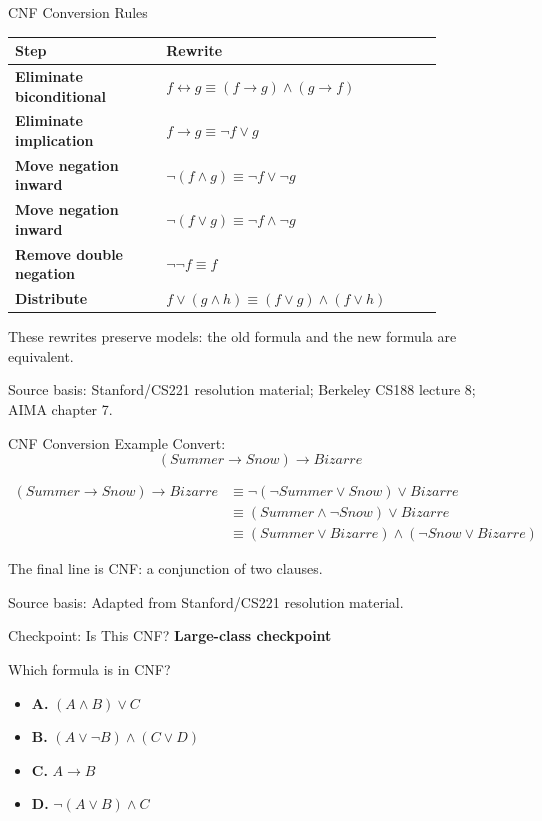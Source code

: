 \documentclass[aspectratio=169,11pt]{beamer}
\newcommand{\activity}{\textbf{\color{unsworange}Large-class checkpoint}}
\newcommand{\choice}[2]{\textbf{#1.} #2}
\newcommand{\source}[1]{\vfill{\scriptsize\color{darkgrey}Source basis: #1}}
\begin{document}
\begin{frame}{CNF Conversion Rules}
  \small
  \begin{tabular}{>{\bfseries}p{0.30\linewidth}p{0.55\linewidth}}
    \toprule
    Step & Rewrite \\
    \midrule
    Eliminate biconditional & $f \leftrightarrow g \equiv (f \rightarrow g) \land (g \rightarrow f)$ \\
    Eliminate implication & $f \rightarrow g \equiv \neg f \lor g$ \\
    Move negation inward & $\neg(f \land g) \equiv \neg f \lor \neg g$ \\
    Move negation inward & $\neg(f \lor g) \equiv \neg f \land \neg g$ \\
    Remove double negation & $\neg\neg f \equiv f$ \\
    Distribute & $f \lor (g \land h) \equiv (f \lor g) \land (f \lor h)$ \\
    \bottomrule
  \end{tabular}

  \vspace{0.8em}
  These rewrites preserve models: the old formula and the new formula are equivalent.

  \source{Stanford/CS221 resolution material; Berkeley CS188 lecture 8; AIMA chapter 7.}
\end{frame}

\begin{frame}{CNF Conversion Example}
  Convert:
  \[
    (Summer \rightarrow Snow) \rightarrow Bizarre
  \]

  \[
  \begin{aligned}
    (Summer \rightarrow Snow) \rightarrow Bizarre
      &\equiv \neg(\neg Summer \lor Snow) \lor Bizarre\\
      &\equiv (Summer \land \neg Snow) \lor Bizarre\\
      &\equiv (Summer \lor Bizarre) \land (\neg Snow \lor Bizarre)
  \end{aligned}
  \]

  The final line is CNF: a conjunction of two clauses.

  \source{Adapted from Stanford/CS221 resolution material.}
\end{frame}

\begin{frame}{Checkpoint: Is This CNF?}
  \activity

  \vspace{0.4em}
  Which formula is in CNF?

  \begin{itemize}
    \item \choice{A}{$(A \land B) \lor C$}
    \item \choice{B}{$(A \lor \neg B) \land (C \lor D)$}
    \item \choice{C}{$A \rightarrow B$}
    \item \choice{D}{$\neg(A \lor B) \land C$}
  \end{itemize}
\end{frame}
\end{document}
